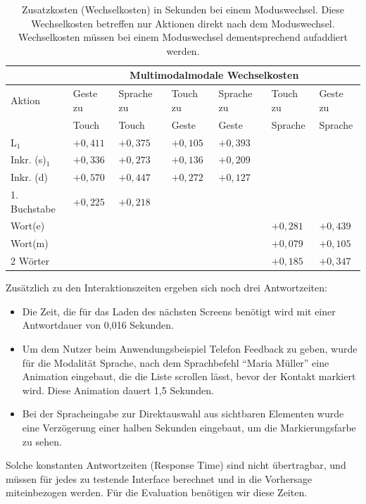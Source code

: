 \begin{table}[ht]
  \centering
		\begin{tabular}{|l|l|l|l|l|l|l|}
				\hline
				& \multicolumn{6}{|c|}{Multimodalmodale Wechselkosten}\\
				\hline
				Aktion 					& Geste zu		& Sprache zu 	& Touch zu		& Sprache zu		& Touch zu		& Geste zu\\
												& Touch 			& Touch 			& Geste 			& Geste					& Sprache 		& Sprache \\
				\hline
				L$_1$ 					& ${+0,411}$ 	&	${+0,375}$	& ${+0,105}$ 	&	${+0,393}$		& \multicolumn{2}{|c|}{}	\\
				\hline
				Inkr. (s)$_1$		& ${+0,336}$ 	&	${+0,273}$ 	& ${+0,136}$ 	&	${+0,209}$		& \multicolumn{2}{|c|}{}	\\
				\hline
				Inkr. (d) 					& ${+0,570}$ 	&	${+0,447}$ 	& ${+0,272}$ 	&	${+0,127}$		& \multicolumn{2}{|c|}{}	\\
				\hline
				1. Buchstabe		& ${+0,225}$ 	& ${+0,218}$ 	&	\multicolumn{2}{|c|}{}			& \multicolumn{2}{|c|}{}	\\
				\hline
				Wort(e) 	& \multicolumn{2}{|c|}{}	& \multicolumn{2}{|c|}{}				& ${+0,281}$ 		& ${+0,439}$\\
				\hline
				Wort(m)	& \multicolumn{2}{|c|}{}	& \multicolumn{2}{|c|}{}				& ${+0,079}$ 		& ${+0,105}$\\
				\hline
				2 Wörter 				& \multicolumn{2}{|c|}{}	& \multicolumn{2}{|c|}{}				& ${+0,185}$ 		& ${+0,347}$\\
				\hline
			\end{tabular}
	\caption[Wechselkosten eines Moduswechsels]{Zusatzkosten (Wechselkosten) in Sekunden bei einem Moduswechsel. Diese Wechselkosten betreffen nur Aktionen direkt nach dem Moduswechsel. Wechselkosten müssen bei einem Moduswechsel dementsprechend aufaddiert werden.}
	\label{tab:Wechselkosten}
\end{table}

Zusätzlich zu den Interaktionszeiten ergeben sich noch drei Antwortzeiten:
\begin{itemize}
\item Die Zeit, die für das Laden des nächsten Screens benötigt wird mit einer Antwortdauer von 0,016 Sekunden.
\item Um dem Nutzer beim Anwendungsbeispiel Telefon Feedback zu geben, wurde für die Modalität Sprache, nach dem Sprachbefehl "`Maria Müller"' eine Animation eingebaut, die die Liste scrollen lässt, bevor der Kontakt markiert wird.
Diese Animation dauert 1,5 Sekunden.
\item Bei der Spracheingabe zur Direktauswahl aus sichtbaren Elementen wurde eine Verzögerung einer halben Sekunden eingebaut, um die Markierungsfarbe zu sehen.
\end{itemize}
Solche konstanten Antwortzeiten (Response Time) sind nicht übertragbar, und müssen für jedes zu testende Interface berechnet und in die Vorhersage miteinbezogen werden.
Für die Evaluation benötigen wir diese Zeiten.

